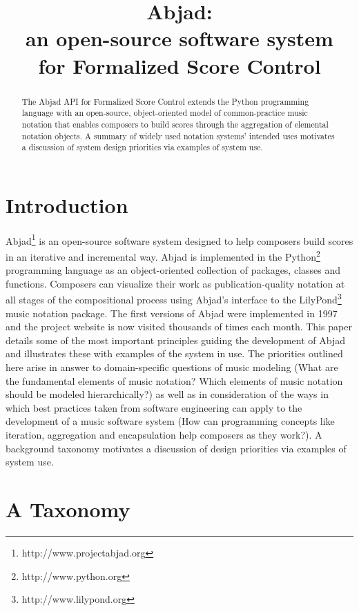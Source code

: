 \documentclass{article}
\title{Abjad: \\
an open-source software system \\
for Formalized Score Control}
\begin{document}
\capstartfalse
\maketitle
\capstarttrue

\begin{abstract}
The Abjad API for Formalized Score Control extends the Python programming
language with an open-source, object-oriented model of common-practice music notation
that enables composers to build scores through the aggregation of elemental notation
objects. A summary of widely used notation systems' intended uses motivates a
discussion of system design priorities via examples of system use.
\end{abstract}
\section{Introduction} \label{sec:introduction}

Abjad\footnote{http://www.projectabjad.org} is an open-source software
system designed to help composers build scores in an iterative and incremental
way.  Abjad is implemented in the Python\footnote{http://www.python.org} programming
language as an object-oriented collection of packages, classes
and functions. Composers can visualize their work as publication-quality
notation at all stages of the compositional process using Abjad's interface to
the LilyPond\footnote{http://www.lilypond.org} music notation package. The first
versions of Abjad were implemented in 1997 and the project website is now
visited thousands of times each month. This paper details some of the most
important principles guiding the development of Abjad and illustrates these with examples of the system in use. The priorities outlined
here arise in answer to domain-specific questions of music modeling (What are
the fundamental elements of music notation? Which elements of music notation
should be modeled hierarchically?) as well as in consideration of the ways in which best practices taken
from software engineering can apply to the development of a music software
system (How can programming concepts like iteration,
aggregation and encapsulation help composers as they work?).
A background taxonomy motivates a discussion of design priorities via examples
of system use.

\section{A Taxonomy} \label{sec:taxonomy}
\end{document}
